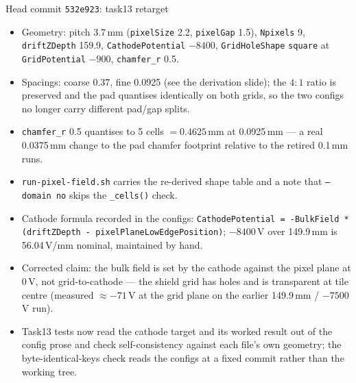 \documentclass[10pt,aspectratio=169]{beamer}
\newcommand{\ti}[1]{\texttt{\footnotesize #1}}
\begin{document}
\begin{frame}[allowframebreaks]{Head commit \texttt{532e923}: task13 retarget}
  \begin{itemize}\small
  \item Geometry: pitch 3.7\,mm (\ti{pixelSize} 2.2, \ti{pixelGap} 1.5),
        \ti{Npixels} 9, \ti{driftZDepth} 159.9, \ti{CathodePotential} $-8400$,
        \ti{GridHoleShape} \ti{square} at \ti{GridPotential} $-900$, \ti{chamfer\_r} 0.5.
  \item Spacings: coarse 0.37, fine 0.0925 (see the derivation slide); the $4{:}1$ ratio is
        preserved and the pad quantises identically on both grids, so the two configs no
        longer carry different pad/gap splits.
  \item \ti{chamfer\_r} 0.5 quantises to 5 cells $=0.4625$\,mm at 0.0925\,mm --- a real
        0.0375\,mm change to the pad chamfer footprint relative to the retired 0.1\,mm runs.
  \item \ti{run-pixel-field.sh} carries the re-derived shape table and a note that
        \ti{--domain no} skips the \ti{\_cells()} check.
  \item Cathode formula recorded in the configs:
        \ti{CathodePotential = -BulkField * (driftZDepth - pixelPlaneLowEdgePosition)};
        $-8400$\,V over 149.9\,mm is 56.04\,V/mm nominal, maintained by hand.
  \item Corrected claim: the bulk field is set by the cathode against the pixel plane at
        0\,V, not grid-to-cathode --- the shield grid has holes and is transparent at tile
        centre (measured $\approx-71$\,V at the grid plane on the earlier
        149.9\,mm / $-7500$\,V run).
  \item Task13 tests now read the cathode target and its worked result out of the config
        prose and check self-consistency against each file's own geometry; the
        byte-identical-keys check reads the configs at a fixed commit rather than the
        working tree.
  \end{itemize}
\end{frame}
\end{document}
